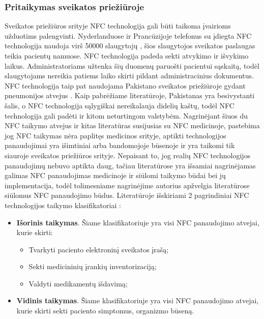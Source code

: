 \subsubsection{Pritaikymas sveikatos priežiūroje}
Sveikatos priežiūros srityje NFC technologija gali būti taikoma įvairioms užduotims palengvinti. Nyderlanduose ir Prancūzijoje telefonus su įdiegta NFC technologija naudoja virš 50000 slaugytojų \cite{ShyamThangaraju2013}, šios slaugytojos sveikatos paslaugas teikia pacientų namuose. NFC technologija padeda sekti atvykimo ir išvykimo laikus. Administratoriams užtenka šių duomenų paruošti pacientui sąskaitą, todėl slaugytojams nereikia patiems laiko skirti pildant administracinius dokumentus. NFC technologija taip pat naudojama Pakistano sveikatos priežiūroje gydant pneumonijos atvejus \cite{Marcus}. Kaip pabrėžiame literatūroje, Pakistanas yra besivystanti šalis, o NFC technologija sąlygiškai nereikalauja didelių kaštų, todėl NFC technologija gali padėti ir kitom neturtingom valstybėm. Nagrinėjant šiuos du NFC taikymo atvejus ir kitas literatūras susijusias su NFC medicinoje, pastebima jog NFC taikymas nėra paplitęs medicinos srityje, aptikti technologijos panaudojimai yra išimtiniai arba bandomojoje būsenoje ir yra taikomi tik siauroje sveikatos priežiūros srityje. Nepaisant to, jog realių NFC technologijos panaudojimų nebuvo aptikta daug, tačiau literatūrose yra išsamiai nagrinėjamas galimas NFC panaudojimas medicinoje ir siūlomi taikymo būdai bei jų implementacija, todėl tolimesniame nagrinėjime autorius apžvelgia literatūrose siūlomus NFC panaudojimo būdus. Literatūroje išskiriami 2 pagrindiniai NFC technologijos taikymo klasifikatoriai \cite{Gautam}:
\begin{itemize}
    \item \textbf{Išorinis taikymas}. Šiame klasifikatoriuje yra visi NFC panaudojimo atvejai, kurie skirti:
        \begin{itemize}
            \item Tvarkyti paciento elektroninį sveikatos įrašą;  
            \item Sekti medicininių įrankių inventorizaciją;
            \item Valdyti medikamentų išdavimą;
        \end{itemize}
    \item \textbf{Vidinis taikymas}. Šiame klasifikatoriuje yra visi NFC panaudojimo atvejai, kurie skirti sekti paciento simptomus, organizmo būseną.
\end{itemize}
 
